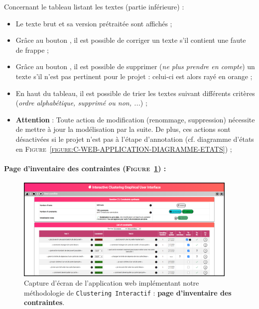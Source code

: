 		Concernant le tableau listant les textes (partie inférieure) :
		\begin{itemize}
			\item Le texte brut et sa version prétraitée sont affichés ;
			\item Grâce au bouton \textguillemets{\faPen}, il est possible de corriger un texte s'il contient une faute de frappe ;
			\item Grâce au bouton \textguillemets{\textcolor{colorApplicationDELETE}{\faTrash}}, il est possible de supprimer (\textit{ne plus prendre en compte}) un texte s'il n'est pas pertinent pour le projet : celui-ci est alors rayé en \textcolor{colorApplicationDELETE}{orange} ;
			\item En haut du tableau, il est possible de trier les textes suivant différents critères (\textit{ordre alphabétique, supprimé ou non, ...}) ;
			\item \textbf{Attention} : Toute action de modification (renommage, suppression) nécessite de mettre à jour la modélisation par la suite.
			De plus, ces actions sont désactivées si le projet n'est pas à l'étape d'annotation (cf. diagramme d'états en \textsc{Figure~\ref{figure:C-WEB-APPLICATION-DIAGRAMME-ETATS}}) ;
		\end{itemize}
	
	
	\newpage
	\paragraph{Page d'inventaire des contraintes (\textsc{Figure~\ref{figure:C-WEB-APPLICATION-INVENTAIRE-CONTRAINTES}}) :}
	
		\begin{figure}[H]
			\centering
			\includegraphics[width=0.95\textwidth]{figures/interactive-clustering-application-contraintes}
			\caption{
				Capture d'écran de l'application web implémentant notre méthodologie de \texttt{Clustering Interactif} : \textbf{page d'inventaire des contraintes}.
			}
			\label{figure:C-WEB-APPLICATION-INVENTAIRE-CONTRAINTES}
		\end{figure}
		
